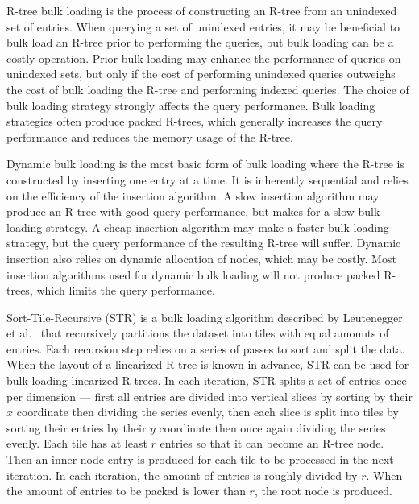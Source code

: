 R-tree bulk loading is the process of constructing an R-tree from an unindexed set of entries. When querying a set of unindexed entries, it may be beneficial to bulk load an R-tree prior to performing the queries, but bulk loading can be a costly operation. Prior bulk loading may enhance the performance of queries on unindexed sets, but only if the cost of performing unindexed queries outweighs the cost of bulk loading the R-tree and performing indexed queries. The choice of bulk loading strategy strongly affects the query performance. Bulk loading strategies often produce packed R-trees, which generally increases the query performance and reduces the memory usage of the R-tree.

Dynamic bulk loading is the most basic form of bulk loading where the R-tree is constructed by inserting one entry at a time. It is inherently sequential and relies on the efficiency of the insertion algorithm. A slow insertion algorithm may produce an R-tree with good query performance, but makes for a slow bulk loading strategy. A cheap insertion algorithm may make a faster bulk loading strategy, but the query performance of the resulting R-tree will suffer. Dynamic insertion also relies on dynamic allocation of nodes, which may be costly. Most insertion algorithms used for dynamic bulk loading will not produce packed R-trees, which limits the query performance.

Sort-Tile-Recursive (STR) is a bulk loading algorithm described by Leutenegger et al.~\cite{leutenegger1997str} that recursively partitions the dataset into tiles with equal amounts of entries. Each recursion step relies on a series of passes to sort and split the data. When the layout of a linearized R-tree is known in advance, STR can be used for bulk loading linearized R-trees. In each iteration, STR splits a set of entries once per dimension --- first all entries are divided into vertical slices by sorting by their \(x\) coordinate then dividing the series evenly, then each slice is split into tiles by sorting their entries by their \(y\) coordinate then once again dividing the series evenly. Each tile has at least \(r\) entries so that it can become an R-tree node. Then an inner node entry is produced for each tile to be processed in the next iteration. In each iteration, the amount of entries is roughly divided by \(r\). When the amount of entries to be packed is lower than \(r\), the root node is produced.
